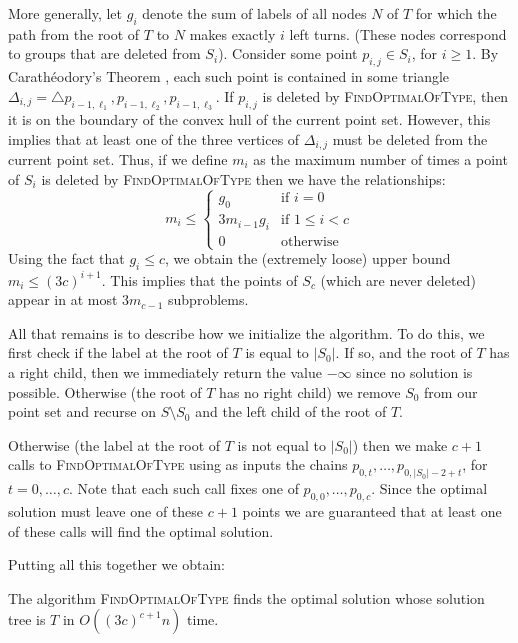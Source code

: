 \documentclass{elsart}
\begin{document}
More generally, let $g_i$ denote the sum of labels of all nodes $N$ of
$T$ for which the path from the root of $T$ to $N$ makes exactly $i$
left turns. (These nodes correspond to groups that are deleted from
$S_i$).  Consider some point $p_{i,j}\in S_i$, for $i\ge 1$.  By
Carath\'eodory's Theorem \cite{eckhoff93}, each such point is contained
in some triangle $\Delta_{i,j}=\triangle
p_{i-1,\ell_1},p_{i-1,\ell_2},p_{i-1,\ell_3}$. If $p_{i,j}$ is deleted
by \textsc{FindOptimalOfType}, then it is on the boundary of the convex
hull of the current point set.  However, this implies that at least
one of the three vertices of $\Delta_{i,j}$ must be deleted from the
current point set.  Thus, if we define $m_i$ as the maximum number of
times a point of $S_i$ is deleted by \textsc{FindOptimalOfType} then
we have the relationships:
\[ 
    m_i \le \left\{\begin{array}{ll}
            g_0 & \mbox{if $i=0$} \\
            3 m_{i-1} g_i & \mbox{if $1\le i< c$} \\
            0 & \mbox{otherwise}      
        \end{array}\right.
\] 
Using the fact that $g_i \le c$, we obtain the (extremely loose) upper
bound $m_i \le (3c)^{i+1}$.  
This implies that the points of $S_c$
(which are never deleted) appear in at most $3m_{c-1}$ subproblems.

All that remains is to describe how we initialize the algorithm.  To
do this, we first check if the label at the root of $T$ is equal to
$|S_0|$. If so, and the root of $T$ has a right child, then we
immediately return the value $-\infty$ since no solution is possible.
Otherwise (the root of $T$ has no right child) we remove $S_0$ from
our point set and recurse on $S\setminus S_0$ and the left child of
the root of $T$.

Otherwise (the label at the root of $T$ is not equal to $|S_0|$) then
we make $c+1$ calls to \textsc{FindOptimalOfType} using as inputs the
chains $p_{0,t},\ldots,p_{0,|S_0|-2+t}$, for $t=0,\ldots,c$.  Note
that each such call fixes one of $p_{0,0},\ldots,p_{0,c}$.  Since the
optimal solution must leave one of these $c+1$ points we are
guaranteed that at least one of these calls will find the optimal solution.

Putting all this together we obtain:

\begin{lem}
The algorithm \textsc{FindOptimalOfType} finds the optimal solution
whose solution tree is $T$ in $O((3c)^{c+1} n)$ time.
\end{lem}
\end{document}
